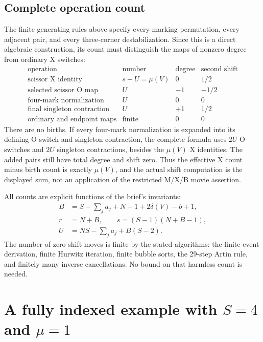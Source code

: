 \documentclass[11pt,a4paper]{article}
\theoremstyle{remark}
\begin{document}
\subsection{Complete operation count}

The finite generating rules above specify every marking permutation,
every adjacent pair, and every three-corner destabilization.  Since
this is a direct algebraic construction, its count must distinguish
the maps of nonzero degree from ordinary X switches:
\[
\begin{array}{l|c|c|c}
\text{operation}&\text{number}&\text{degree}
 &\text{second shift}\\\hline
\text{scissor X identity}&s-U=\mu(V)&0&1/2\\
\text{selected scissor O map}&U&-1&-1/2\\
\text{four-mark normalization}&U&0&0\\
\text{final singleton contraction}&U&+1&1/2\\
\text{ordinary and endpoint maps}&\text{finite}&0&0
\end{array}
\]
There are no births.  If every four-mark normalization is expanded
into its defining O switch and singleton contraction, the complete
formula uses $2U$ O switches and $2U$ singleton contractions, besides
the $\mu(V)$ X identities.  The added pairs still have total degree
and shift zero.  Thus the effective X count minus birth count is
exactly $\mu(V)$, and the actual shift computation is the displayed
sum, not an application of the restricted M/X/B movie assertion.

All counts are explicit functions of the brief's invariants:
\[
\begin{split}
B&=S-\sum_j a_j+N-1+2\delta(V)-b+1,\\
r&=N+B,\qquad s=(S-1)(N+B-1),\\
U&=NS-\sum_j a_j+B(S-2).
\end{split}
\]
The number of zero-shift moves is finite by the stated algorithms:
the finite event derivation, finite Hurwitz iteration, finite
bubble sorts, the 29-step Artin rule, and finitely many inverse
cancellations.  No bound on that harmless count is needed.


\section{A fully indexed example with \texorpdfstring{$S=4$ and $\mu=1$}{S=4 and mu=1}}
\label{sec:worked-four}
\end{document}
